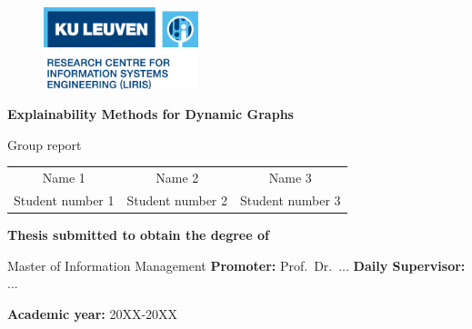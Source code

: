 \begin{titlepage}
\begin{figure}[h]{%
      \includegraphics[width=0.4\textwidth]{Logo.png}
    }
\end{figure}

\vspace*{2cm}

{\Huge  \textbf{Explainability Methods for Dynamic Graphs}}

\vspace*{0.5cm} 

{\Large Group report}

{\raggedleft\vfill{%

%
%
\setlength{\tabcolsep}{12pt}
\begin{tabular}{c c c}
        {\Large Name 1}  &  {\Large Name 2} & {\Large Name 3} \\
        {Student number 1}  & {Student number 2} & {Student number 3} 
\end{tabular}
\linebreak
\vspace*{1.5cm}


\textbf{{\large Thesis submitted to obtain \linebreak
the degree of}} \linebreak

{\large Master of Information Management}\linebreak
\linebreak
\textbf{{\large Promoter:}}   Prof.\ Dr.\ ... \linebreak
\textbf{{\large Daily Supervisor:}}  ... \linebreak


\textbf{{\large Academic year:}} {\large 20XX-20XX}
\linebreak
}\par}

\end{titlepage}
\restoregeometry
\clearpage


